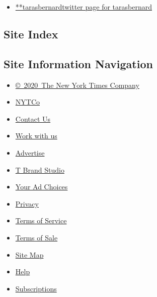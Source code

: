 \begin{itemize}
\tightlist
\item
  \href{https://twitter.com/tarasbernard}{**tarasbernardtwitter page for
  tarasbernard}
\end{itemize}

\hypertarget{site-index}{%
\subsection{Site Index}\label{site-index}}

\hypertarget{site-information-navigation}{%
\subsection{Site Information
Navigation}\label{site-information-navigation}}

\begin{itemize}
\tightlist
\item
  \href{https://help.nytimes3xbfgragh.onion/hc/en-us/articles/115014792127-Copyright-notice}{©~2020~The
  New York Times Company}
\end{itemize}

\begin{itemize}
\tightlist
\item
  \href{https://www.nytco.com/}{NYTCo}
\item
  \href{https://help.nytimes3xbfgragh.onion/hc/en-us/articles/115015385887-Contact-Us}{Contact
  Us}
\item
  \href{https://www.nytco.com/careers/}{Work with us}
\item
  \href{https://nytmediakit.com/}{Advertise}
\item
  \href{http://www.tbrandstudio.com/}{T Brand Studio}
\item
  \href{https://www.nytimes3xbfgragh.onion/privacy/cookie-policy\#how-do-i-manage-trackers}{Your
  Ad Choices}
\item
  \href{https://www.nytimes3xbfgragh.onion/privacy}{Privacy}
\item
  \href{https://help.nytimes3xbfgragh.onion/hc/en-us/articles/115014893428-Terms-of-service}{Terms
  of Service}
\item
  \href{https://help.nytimes3xbfgragh.onion/hc/en-us/articles/115014893968-Terms-of-sale}{Terms
  of Sale}
\item
  \href{https://spiderbites.nytimes3xbfgragh.onion}{Site Map}
\item
  \href{https://help.nytimes3xbfgragh.onion/hc/en-us}{Help}
\item
  \href{https://www.nytimes3xbfgragh.onion/subscription?campaignId=37WXW}{Subscriptions}
\end{itemize}
